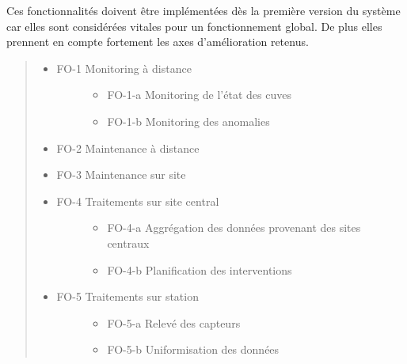 \documentclass[a4paper,12pt]{article}
\begin{document}
Ces fonctionnalités doivent être implémentées dès la première version du système car elles sont considérées vitales pour un fonctionnement global. De plus elles prennent en compte fortement les axes d'amélioration retenus.
%
\begin{quote}
%
\begin{itemize}

\item %
\begin{description}
\item[{FO-1 Monitoring à distance}] \leavevmode %
\begin{itemize}

\item FO-1-a Monitoring de l'état des cuves

\item FO-1-b Monitoring des anomalies

\end{itemize}

\end{description}

\item FO-2 Maintenance à distance

\item FO-3 Maintenance sur site

\item %
\begin{description}
\item[{FO-4 Traitements sur site central}] \leavevmode %
\begin{itemize}

\item FO-4-a Aggrégation des données provenant des sites centraux

\item FO-4-b Planification des interventions

\end{itemize}

\end{description}

\item %
\begin{description}
\item[{FO-5 Traitements sur station}] \leavevmode %
\begin{itemize}

\item FO-5-a Relevé des capteurs

\item FO-5-b Uniformisation des données


\end{itemize}
\end{description}
\end{itemize}
\end{quote}
\end{document}
